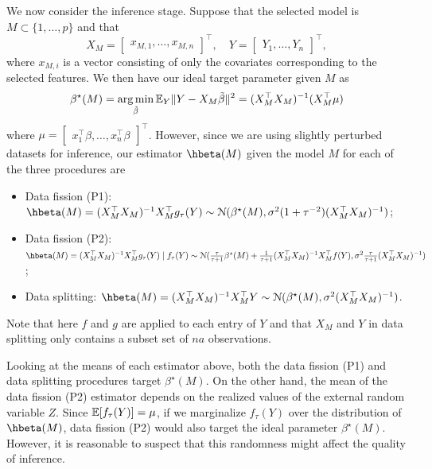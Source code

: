 We now consider the inference stage. Suppose that the selected model is $M\subset\{1,\dots,p\}$ and that
\[
X_M = \begin{bmatrix} x_{M,1}, \dots, x_{M,n} \end{bmatrix}^\top, \quad Y = \begin{bmatrix} Y_1, \dots, Y_n \end{bmatrix}^\top,
\]
where $x_{M,i}$ is a vector consisting of only the covariates corresponding to the selected features. We then have our ideal target parameter given $M$ as
\[
\beta^\star(M) = \argmin_{\tilde{\beta}} \EE_Y \|Y - X_M\tilde{\beta}\|^2 = (X_M^\top X_M)^{-1}(X_M^\top\mu)
\]
where $\mu = \begin{bmatrix} x_1^\top\beta, \dots, x_n^\top\beta \end{bmatrix}^\top$. However, since we are using slightly perturbed datasets for inference, our estimator $\hbeta(M)$ given the model $M$ for each of the three procedures are
\begin{itemize}
\item Data fission (P1): $\hbeta(M) = (X_M^\top X_M)^{-1}X_M^\top g_\tau(Y) \distas \distNorm(\beta^\star(M), \sigma^2(1+\tau^{-2})(X_M^\top X_M)^{-1})$;
\item Data fission (P2):\\ $\hbeta(M) = (X_M^\top X_M)^{-1}X_M^\top g_\tau(Y) \given f_\tau(Y) \distas \distNorm(\frac{\tau}{\tau+1}\beta^\star(M) + \frac{1}{\tau+1}(X_M^\top X_M)^{-1}X_M^\top f(Y), \sigma^2\frac{\tau}{\tau+1}(X_M^\top X_M)^{-1})$;
\item Data splitting: $\hbeta(M) = (X_M^\top X_M)^{-1}X_M^\top Y \distas \distNorm(\beta^\star(M), \sigma^2(X_M^\top X_M)^{-1})$.
\end{itemize}
Note that here $f$ and $g$ are applied to each entry of $Y$ and that $X_M$ and $Y$ in data splitting only contains a subset set of $na$ observations.

Looking at the means of each estimator above, both the data fission (P1) and data splitting procedures target $\beta^\star(M)$. On the other hand, the mean of the data fission (P2) estimator depends on the realized values of the external random variable $Z$. Since $\mathbb{E}[f_\tau(Y)] = \mu$, if we marginalize $f_\tau(Y)$ over the distribution of $\hbeta(M)$, data fission (P2) would also target the ideal parameter $\beta^\star(M)$. However, it is reasonable to suspect that this randomness might affect the quality of inference.

